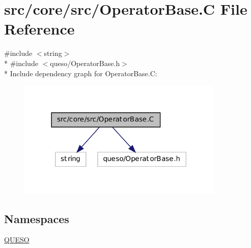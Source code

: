\hypertarget{_operator_base_8_c}{\section{src/core/src/\-Operator\-Base.C File Reference}
\label{_operator_base_8_c}
}
{\ttfamily \#include $<$string$>$}\\*
{\ttfamily \#include $<$queso/\-Operator\-Base.\-h$>$}\\*
Include dependency graph for Operator\-Base.\-C\-:
\nopagebreak
\begin{figure}[H]
\begin{center}
\leavevmode
\includegraphics[width=278pt]{_operator_base_8_c__incl}
\end{center}
\end{figure}
\subsection*{Namespaces}
\begin{DoxyCompactItemize}
\item 
\hyperlink{namespace_q_u_e_s_o}{Q\-U\-E\-S\-O}
\end{DoxyCompactItemize}
